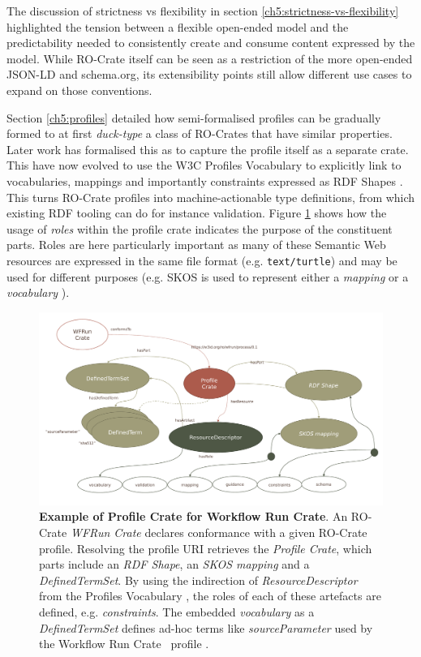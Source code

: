 The discussion of strictness vs flexibility in section \vref{ch5:strictness-vs-flexibility} highlighted the tension between a flexible open-ended model and the predictability needed to consistently create and consume content expressed by the model.
While RO-Crate itself can be seen as a restriction of the more open-ended JSON-LD and schema.org, its extensibility points still allow different use cases to expand on those conventions.  

Section \vref{ch5:profiles} detailed how semi-formalised profiles can be gradually formed to at first \emph{duck-type} a class of RO-Crates that have similar properties.
Later work has formalised this as  to capture the profile itself as a separate crate. This have now evolved to use the W3C Profiles Vocabulary \cite{Atkinson 2019} to explicitly link to vocabularies, mappings and importantly constraints expressed as RDF Shapes \cite{Soiland-Reyes 2023d}. 
This turns RO-Crate profiles into machine-actionable type definitions, from which existing RDF tooling can do for instance validation. 
Figure \ref{ch61:fig:profilecrate} shows how the usage of \emph{roles} within the profile crate indicates the purpose of the constituent parts.
Roles are here particularly important as many of these Semantic Web resources are expressed in the same file format (e.g. \texttt{text/turtle}) and may be used for different purposes (e.g.
SKOS is used to represent either a \emph{mapping} or a \emph{vocabulary} \cite{Isaac 2009}).

\begin{figure}[htb]
    \includegraphics[width=\textwidth]{figures/ch09/profile-crate.pdf}
      \caption[Example of Profile Crate]{\textbf{Example of Profile Crate for Workflow Run Crate}. 
      An RO-Crate \emph{WFRun Crate} declares conformance with a given RO-Crate profile. 
      Resolving the profile URI retrieves the \emph{Profile Crate}, which parts include an \emph{RDF Shape}, an \emph{SKOS mapping} and a \emph{DefinedTermSet}. 
      By using the indirection of \emph{ResourceDescriptor} from the Profiles Vocabulary \cite{Atkinson 2019}, the roles of each of these artefacts are defined, e.g. \emph{constraints}. 
      The embedded \emph{vocabulary} as a \emph{DefinedTermSet} defines ad-hoc terms like \emph{sourceParameter} used by the Workflow Run Crate\footnotemark~ profile \cite{Leo 2023b}.
      }
    \label{ch61:fig:profilecrate}
  \end{figure}

